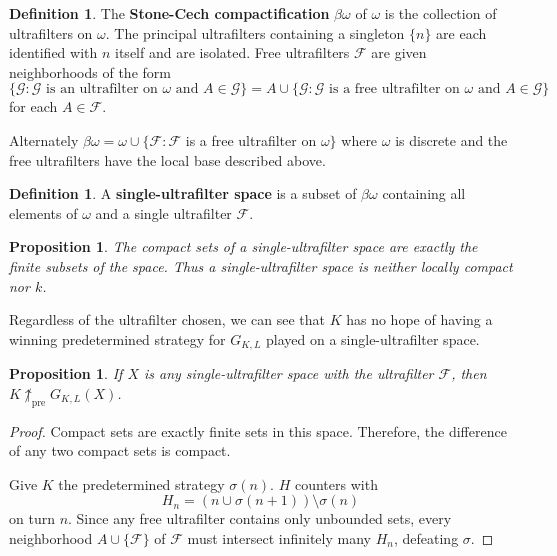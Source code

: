 \documentclass[11pt]{article}
\theoremstyle{plain}
\newtheorem{proposition}[theorem]{Proposition}
\theoremstyle{definition}
\newtheorem{definition}[theorem]{Definition}
\theoremstyle{remark}
\newcommand{\prewin}{\uparrow_{\text{pre}}}
\begin{document}
\begin{definition}
The \textbf{Stone-Cech compactification} $\beta\omega$ of $\omega$ is the collection of ultrafilters on $\omega$. The principal ultrafilters containing a singleton $\{n\}$ are each identified with $n$ itself and are isolated. Free ultrafilters $\mathcal{F}$ are given neighborhoods of the form \[\{\mathcal{G} : \mathcal{G} \text{ is an ultrafilter on } \omega \text{ and } A \in \mathcal{G}\} = A \cup \{\mathcal{G}: \mathcal{G} \text{ is a free ultrafilter on } \omega \text{ and } A \in \mathcal{G}\}\] for each $A\in\mathcal{F}$.

Alternately $\beta\omega=\omega\cup\{\mathcal{F} : \mathcal{F}$ is a free ultrafilter on $\omega\}$ where $\omega$ is discrete and the free ultrafilters have the local base described above.
\end{definition}

\begin{definition}
A \textbf{single-ultrafilter space} is a subset of $\beta\omega$ containing all elements of $\omega$ and a single ultrafilter $\mathcal{F}$.
\end{definition}

\begin{proposition}
The compact sets of a single-ultrafilter space are exactly the finite subsets of the space. Thus a single-ultrafilter space is neither locally compact nor $k$.
\end{proposition}

Regardless of the ultrafilter chosen, we can see that $K$ has no hope of having a winning predetermined strategy for $G_{K,L}$ played on a single-ultrafilter space.

\begin{proposition}
If $X$ is any single-ultrafilter space with the ultrafilter $\mathcal{F}$, then $K\not\prewin G_{K,L}(X)$.
\end{proposition}

\begin{proof}
Compact sets are exactly finite sets in this space. Therefore, the difference of any two compact sets is compact.

Give $K$ the predetermined strategy $\sigma(n)$. $H$ counters with \[H_n=(n\cup\sigma(n+1))\setminus\sigma(n)\] on turn $n$. Since any free ultrafilter contains only unbounded sets, every neighborhood $A\cup\{\mathcal{F}\}$ of $\mathcal{F}$ must intersect infinitely many $H_n$, defeating $\sigma$.
\end{proof}
\end{document}
